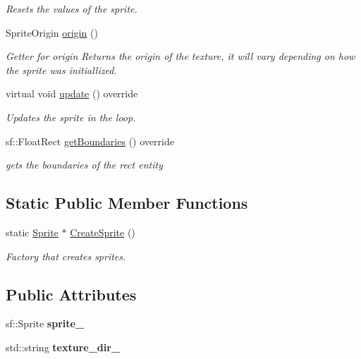 \begin{DoxyCompactItemize}
\begin{DoxyCompactList}\small\item\em Resets the values of the sprite. \end{DoxyCompactList}\item 
Sprite\+Origin \hyperlink{class_sprite_a0eccfb75237b7c5eda33810cb1080daf}{origin} ()
\begin{DoxyCompactList}\small\item\em Getter for origin Returns the origin of the texture, it will vary depending on how the sprite was initiallized. \end{DoxyCompactList}\item 
virtual void \hyperlink{class_sprite_a1070fccd6830382b72e3f3a8785afc8c}{update} () override
\begin{DoxyCompactList}\small\item\em Updates the sprite in the loop. \end{DoxyCompactList}\item 
sf\+::\+Float\+Rect \hyperlink{class_sprite_add63c87af068cdcdb536eb1c82644ab4}{get\+Boundaries} () override
\begin{DoxyCompactList}\small\item\em gets the boundaries of the rect entity \end{DoxyCompactList}\end{DoxyCompactItemize}
\subsection*{Static Public Member Functions}
\begin{DoxyCompactItemize}
\item 
static \hyperlink{class_sprite}{Sprite} $\ast$ \hyperlink{class_sprite_aaabea785dc01ff0246b290fc9e6b3f62}{Create\+Sprite} ()
\begin{DoxyCompactList}\small\item\em Factory that creates sprites. \end{DoxyCompactList}\end{DoxyCompactItemize}
\subsection*{Public Attributes}
\begin{DoxyCompactItemize}
\item 
\mbox{\label{class_sprite_abf366a9a6edad58a8e2bb8a61cc2c3cd}} 
sf\+::\+Sprite {\bfseries sprite\+\_\+}
\item 
\mbox{\label{class_sprite_a06bd345188635cf4ecd14c0388458f87}} 
std\+::string {\bfseries texture\+\_\+dir\+\_\+}
\end{DoxyCompactItemize}
